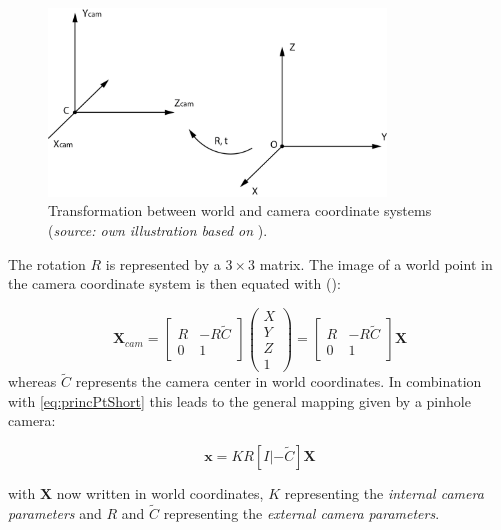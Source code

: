 \begin{figure}[htbp]
		\centering
		\includegraphics[width=0.8\textwidth]{figures/CoordinateSystemRT}
		\caption[Transformation between world and camera coordinate systems]{Transformation between world and camera coordinate systems (\textit{source: own illustration based on} \cite[p.156]{Hartley.2011}).}
		\label{fig:CoordinateSystemRT}
\end{figure}


The rotation $R$ is represented by a $3\times 3$ matrix. The image of a world point in the camera coordinate system is then equated with (\cite[p.155 et seq.]{Hartley.2011}):

\begin{equation}
 \mathbf{X}_{cam}=
 \begin{bmatrix}
  R & -R\tilde{C} \\
  0 & 1
 \end{bmatrix}
 \begin{pmatrix}
  X \\
  Y \\
  Z \\
  1
 \end{pmatrix}=
 \begin{bmatrix}
  R & -R\tilde{C} \\
  0 & 1
 \end{bmatrix}\mathbf{X}
\end{equation}
whereas $\tilde{C}$ represents the camera center in world coordinates.
In combination with \autoref{eq:princPtShort} this leads to the general mapping given by a pinhole camera:

\begin{equation}
 \mathbf{x}=KR[I|-\tilde{C}]\mathbf{X}\label{eq:pinholeMapping}
\end{equation}

with $\mathbf{X}$ now written in world coordinates, $K$ representing the \textit{internal camera parameters} and $R$ and $\tilde{C}$ representing the \textit{external camera parameters}. 

